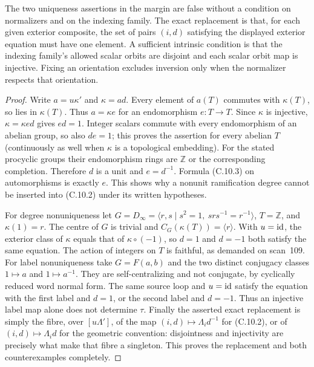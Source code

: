 The two uniqueness assertions in
the margin are false without a
condition on normalizers and on
the indexing family. The exact
replacement is that, for each
given exterior composite, the
set of pairs $(i,d)$ satisfying
the displayed exterior equation
must have one element. A sufficient
intrinsic condition is that the
indexing family's allowed scalar
orbits are disjoint and each scalar
orbit map is injective. Fixing an
orientation excludes inversion
only when the normalizer respects
that orientation.

\begin{proof}
Write $a=u\kappa'$ and $\kappa=ad$.
Every element of $a(T)$ commutes
with $\kappa(T)$, so lies in
$\kappa(T)$. Thus $a=\kappa e$
for an endomorphism $e:T\to T$.
Since $\kappa$ is injective,
$\kappa=\kappa ed$ gives $ed=1$.
Integer scalars commute with every endomorphism of an
abelian group, so also $de=1$; this proves the assertion
for every abelian $T$ (continuously as well when $\kappa$
is a topological embedding). For the stated procyclic groups
their endomorphism rings are
$\mathbb Z$ or the corresponding
completion. Therefore $d$ is a
unit and $e=d^{-1}$. Formula
(C.10.3) on automorphisms is
exactly $e$. This shows why a
nonunit ramification degree cannot
be inserted into (C.10.2) under
its written hypotheses.

For degree nonuniqueness let
$G=D_\infty=\langle r,s\mid
s^2=1,\ srs^{-1}=r^{-1}\rangle$,
$T=\mathbb Z$, and $\kappa(1)=r$.
The centre of $G$ is trivial and
$C_G(\kappa(T))=\langle r\rangle$.
With $u=\mathrm{id}$, the exterior class
of $\kappa$ equals that of
$\kappa\circ(-1)$, so $d=1$ and
$d=-1$ both satisfy the same
equation. The action of integers
on $T$ is faithful, as demanded
on scan~109. For label
nonuniqueness take $G=F(a,b)$
and the two distinct conjugacy
classes $1\mapsto a$ and
$1\mapsto a^{-1}$. They are
self-centralizing and not
conjugate, by cyclically reduced
word normal form. The same
source loop and $u=\mathrm{id}$ satisfy
the equation with the first
label and $d=1$, or the second
label and $d=-1$. Thus an
injective label map alone does
not determine $\tau$. Finally
the asserted exact replacement
is simply the fibre, over $[u\Lambda']$, of the map
$(i,d)\mapsto\Lambda_i d^{-1}$ for (C.10.2),
or of $(i,d)\mapsto\Lambda_i d$ for the geometric convention:
disjointness and injectivity
are precisely what make that
fibre a singleton. This proves
the replacement and both
counterexamples completely.
\end{proof}

